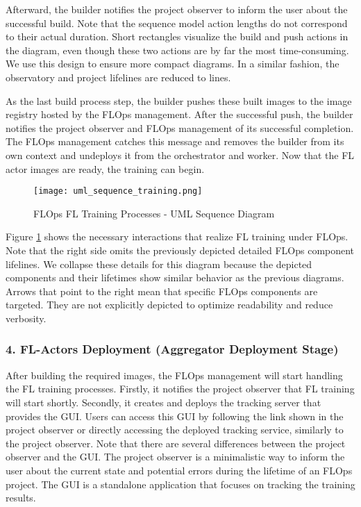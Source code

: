 Afterward, the builder notifies the project observer to inform the user about the successful build.
Note that the sequence model action lengths do not correspond to their actual duration.
Short rectangles visualize the build and push actions in the diagram, even though these two actions are by far the most time-consuming.
We use this design to ensure more compact diagrams.
In a similar fashion, the observatory and project lifelines are reduced to lines.

As the last build process step, the builder pushes these built images to the image registry hosted by the FLOps management.
After the successful push, the builder notifies the project observer and FLOps management of its successful completion.
The FLOps management catches this message and removes the builder from its own context and undeploys it from the orchestrator and worker.
Now that the FL actor images are ready, the training can begin.

\begin{figure}[p]
    \begin{adjustwidth}{-0.2\paperwidth}{-0.2\paperwidth}
        \centering
        \texttt{[image: uml\_sequence\_training.png]}
        \caption{FLOps FL Training Processes - UML Sequence Diagram}
        \label{fig:uml_sequence_training}
    \end{adjustwidth}
\end{figure}

Figure \ref{fig:uml_sequence_training} shows the necessary interactions that realize FL training under FLOps.
Note that the right side omits the previously depicted detailed FLOps component lifelines.
We collapse these details for this diagram because the depicted components and their lifetimes show similar behavior as the previous diagrams.
Arrows that point to the right mean that specific FLOps components are targeted.
They are not explicitly depicted to optimize readability and reduce verbosity.

\subsubsection{4. FL-Actors Deployment (Aggregator Deployment Stage)}
After building the required images, the FLOps management will start handling the FL training processes.
Firstly, it notifies the project observer that FL training will start shortly.
Secondly, it creates and deploys the tracking server that provides the GUI.
Users can access this GUI by following the link shown in the project observer or directly accessing the deployed tracking service, similarly to the project observer.
Note that there are several differences between the project observer and the GUI.
The project observer is a minimalistic way to inform the user about the current state and potential errors during the lifetime of an FLOps project.
The GUI is a standalone application that focuses on tracking the training results.

